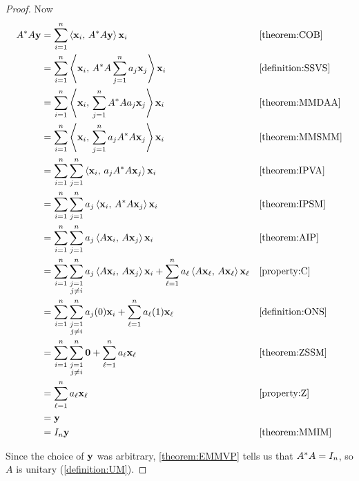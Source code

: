 \documentclass{ximera}
\begin{document}
\begin{theorem}
\begin{proof}
    Now
    \begin{align*}
      A^\ast A\mathbf{y}
      &=\sum_{i=1}^{n}\left\langle\mathbf{x}_i,\,A^\ast A\mathbf{y}\right\rangle\mathbf{x}_i
      &&\ref{theorem:COB}\\
      &=\sum_{i=1}^{n}\left\langle\mathbf{x}_i,\,A^\ast A\sum_{j=1}^{n}a_j\mathbf{x}_j\right\rangle\mathbf{x}_i
      &&\ref{definition:SSVS}\\
      &=\sum_{i=1}^{n}\left\langle\mathbf{x}_i,\,\sum_{j=1}^{n}A^\ast Aa_j\mathbf{x}_j\right\rangle\mathbf{x}_i
      &&\ref{theorem:MMDAA}\\
      &=\sum_{i=1}^{n}\left\langle\mathbf{x}_i,\,\sum_{j=1}^{n}a_jA^\ast A\mathbf{x}_j\right\rangle\mathbf{x}_i
      &&\ref{theorem:MMSMM}\\
      &=\sum_{i=1}^{n}\sum_{j=1}^{n}\left\langle\mathbf{x}_i,\,a_jA^\ast A\mathbf{x}_j\right\rangle\mathbf{x}_i
      &&\ref{theorem:IPVA}\\
      &=\sum_{i=1}^{n}\sum_{j=1}^{n}a_j\left\langle\mathbf{x}_i,\,A^\ast A\mathbf{x}_j\right\rangle\mathbf{x}_i
      &&\ref{theorem:IPSM}\\
      &=\sum_{i=1}^{n}\sum_{j=1}^{n}a_j\left\langle A\mathbf{x}_i,\,A\mathbf{x}_j\right\rangle\mathbf{x}_i
      &&\ref{theorem:AIP}\\
      &=
        \sum_{i=1}^{n}\sum_{\substack{j=1\\j\neq i}}^{n}a_j\left\langle A\mathbf{x}_i,\,A\mathbf{x}_j\right\rangle\mathbf{x}_i
      +
      \sum_{\ell=1}^{n}a_\ell\left\langle A\mathbf{x}_\ell,\,A\mathbf{x}_\ell\right\rangle\mathbf{x}_\ell
      &&\ref{property:C}\\
      &=
        \sum_{i=1}^{n}\sum_{\substack{j=1\\j\neq i}}^{n}a_j(0)\mathbf{x}_i
      +
      \sum_{\ell=1}^{n}a_\ell(1)\mathbf{x}_\ell
      &&\ref{definition:ONS}\\
      &=
        \sum_{i=1}^{n}\sum_{\substack{j=1\\j\neq i}}^{n}\mathbf{0}
      +
      \sum_{\ell=1}^{n}a_\ell\mathbf{x}_\ell
      &&\ref{theorem:ZSSM}\\
      &=\sum_{\ell=1}^{n}a_\ell\mathbf{x}_\ell
      &&\ref{property:Z}\\
      &=\mathbf{y}\\
      &=I_n\mathbf{y}
      &&\ref{theorem:MMIM}
    \end{align*}
    
    Since the choice of $\mathbf{y}$ was arbitrary, \ref{theorem:EMMVP} tells us that $A^\ast A=I_n$, so $A$ is unitary (\ref{definition:UM}).
  \end{proof}
\end{theorem}
\end{document}
